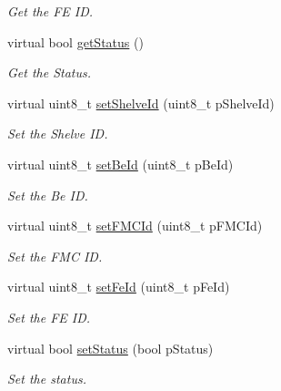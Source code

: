 \begin{DoxyCompactItemize}
\begin{DoxyCompactList}\small\item\em Get the F\-E I\-D. \end{DoxyCompactList}\item 
virtual bool \hyperlink{class_ph2___hw_description_1_1_f_e_description_a617ae77418832f97179026559685ea2d}{get\-Status} ()
\begin{DoxyCompactList}\small\item\em Get the Status. \end{DoxyCompactList}\item 
virtual uint8\-\_\-t \hyperlink{class_ph2___hw_description_1_1_f_e_description_ab207edf946f371bef6860fb6ce4deb65}{set\-Shelve\-Id} (uint8\-\_\-t p\-Shelve\-Id)
\begin{DoxyCompactList}\small\item\em Set the Shelve I\-D. \end{DoxyCompactList}\item 
virtual uint8\-\_\-t \hyperlink{class_ph2___hw_description_1_1_f_e_description_a13f1c20eb678b8e23d2590a8ff23d349}{set\-Be\-Id} (uint8\-\_\-t p\-Be\-Id)
\begin{DoxyCompactList}\small\item\em Set the Be I\-D. \end{DoxyCompactList}\item 
virtual uint8\-\_\-t \hyperlink{class_ph2___hw_description_1_1_f_e_description_af0c396a0475a508e8aca069bb5b3c577}{set\-F\-M\-C\-Id} (uint8\-\_\-t p\-F\-M\-C\-Id)
\begin{DoxyCompactList}\small\item\em Set the F\-M\-C I\-D. \end{DoxyCompactList}\item 
virtual uint8\-\_\-t \hyperlink{class_ph2___hw_description_1_1_f_e_description_a681786aea17ed86c40a3274783d5f6b5}{set\-Fe\-Id} (uint8\-\_\-t p\-Fe\-Id)
\begin{DoxyCompactList}\small\item\em Set the F\-E I\-D. \end{DoxyCompactList}\item 
virtual bool \hyperlink{class_ph2___hw_description_1_1_f_e_description_aa6e842d9be9aba79eccf5691ca6f7695}{set\-Status} (bool p\-Status)
\begin{DoxyCompactList}\small\item\em Set the status. \end{DoxyCompactList}\end{DoxyCompactItemize}
